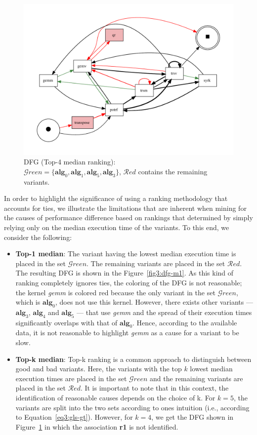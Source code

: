 \documentclass[acmsmall,screen, review]{acmart}
\begin{document}
\begin{figure}[h!]
	\centering
	\includegraphics[width=.7\linewidth]{fig/ch3/gls-top4}
	\caption{DFG (Top-4 median ranking):  \\ $\mathcal{G}reen = \{ \mathbf{alg}_0, \mathbf{alg}_1, \mathbf{alg}_5, \mathbf{alg}_3\}$, $\mathcal{R}ed$ contains the remaining variants.}
	\label{fig3:dfg-m4}
\end{figure}

In order to highlight the significance of using a ranking methodology that accounts for ties, we illustrate the limitations that are inherent when mining for the causes of performance difference based on rankings that determined by simply relying only on the median execution time of the variants. To this end, we consider the following:
\begin{itemize}
	\item \textbf{Top-1 median}: The variant having the lowest median execution time is placed in the set $\mathcal{G}reen$. The remaining variants are placed in the set $\mathcal{R}ed$. The resulting DFG is shown in the Figure~\ref{fig3:dfg-m1}. As this kind of ranking completely ignores ties, the coloring of the DFG is not reasonable; the kernel \textit{gemm} is colored red because the only variant in the set $\mathcal{G}reen$, which is $\mathbf{alg}_0$, does not use this kernel.  However, there exists other variants --- $\mathbf{alg}_3$, $\mathbf{alg}_4$ and $\mathbf{alg}_5$ --- that use \textit{gemm} and the spread of their execution times significantly overlaps with that of $\mathbf{alg}_0$. Hence, according to the available data, it is not reasonable to highlight \textit{gemm} as a cause for a variant to be slow. 
	\item \textbf{Top-k median}: Top-k ranking is a common approach to distinguish between good and bad variants. Here, the variants with the top $k$ lowest median execution times are placed in the set $\mathcal{G}reen$ and the remaining variants are placed in the set $\mathcal{R}ed$. It is important to note that in this context, the identification of reasonable causes depends on the choice of k. For $k=5$, the variants are split into the two sets according to ones intuition (i.e., according to Equation~\ref{eq3:gls-gt}). However, for $k=4$, we get the DFG shown in Figure~\ref{fig3:dfg-m4} in which the association \textbf{r1} is not identified. 
\end{itemize}
\end{document}
